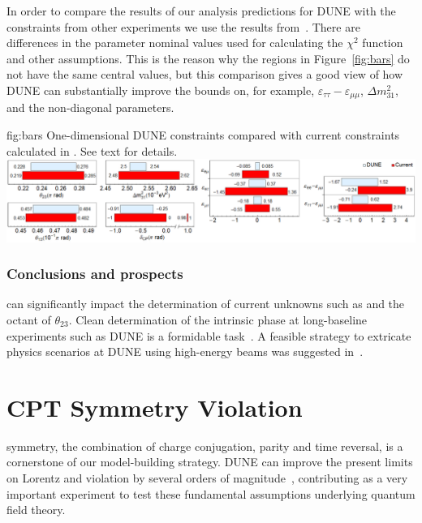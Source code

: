 In order to compare the results of our analysis predictions for DUNE with the constraints from other experiments we use the results from~\cite{Farzan:2017xzy}. There are differences in the parameter nominal values used for calculating the $\chi^2$ function and other assumptions. This is the reason why the regions in Figure~\ref{fig:bars} do not have the same central values, but this comparison gives a good view of how DUNE can substantially improve the bounds on, for example, $\varepsilon_{\tau\tau}-\varepsilon_{\mu\mu}$, $\Delta m^2_{31}$, and the non-diagonal  parameters.

\begin{dunefigure}
{fig:bars}
{One-dimensional DUNE constraints compared with current constraints calculated in \cite{Farzan:2017xzy}. See text for details.}
\includegraphics[width=1.0\columnwidth]{graphics/Barras_Geral_dune.png}
\end{dunefigure}


\subsubsection{Conclusions and prospects}
 can significantly impact the determination of current unknowns such as  and the octant of $\theta_{23}$. Clean determination of the intrinsic  phase at long-baseline experiments such as DUNE is a formidable task~\cite{Rout:2017udo}. A feasible strategy to extricate physics scenarios at DUNE using high-energy beams was suggested in~\cite{Masud:2017bcf}.


\section{CPT Symmetry Violation}

 symmetry, the combination of charge conjugation, parity and time reversal, is a cornerstone of our model-building strategy. 
DUNE can improve the present limits on Lorentz and  violation by several orders of magnitude~\cite{Streater:1989vi,Barenboim:2002tz,Kostelecky:2003cr,Diaz:2009qk,Kostelecky:2011gq,Barenboim:2017ewj}, contributing as a very important experiment to test these fundamental assumptions underlying quantum field theory.

